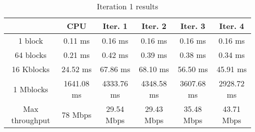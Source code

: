\begin{table}
	\caption{Iteration 1 results}
	\centering
	\begin{tabular}{cccccc}
		\toprule
		 & CPU & Iter. 1 & Iter. 2 & Iter. 3 & Iter. 4 \\
		\midrule
		1 block & 0.11 ms & 0.16 ms & 0.16 ms & 0.16 ms & 0.16 ms \\
		64 blocks & 0.21 ms & 0.42 ms & 0.39 ms & 0.38 ms & 0.34 ms \\
		16 Kblocks & 24.52 ms & 67.86 ms & 68.10 ms & 56.50 ms & 45.91 ms \\
		1 Mblocks & 1641.08 ms & 4333.76 ms & 4348.58 ms & 3607.68 ms & 2928.72 ms \\
		Max throughput & 78 Mbps & 29.54 Mbps & 29.43 Mbps & 35.48 Mbps & 43.71 Mbps \\
		\bottomrule
	\end{tabular}
\end{table}
